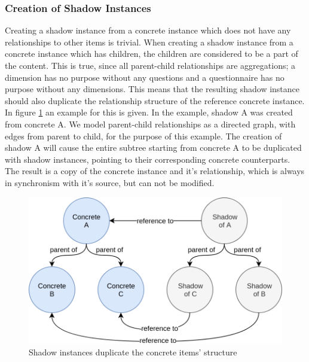 \documentclass[a4paper,11pt]{article}
\begin{document}
                \subsubsection{Creation of Shadow Instances}
                    Creating a shadow instance from a concrete instance which
                    does not have any relationships to other items is trivial.
                    When creating a shadow instance from a concrete instance
                    which has children, the children are considered to be a part
                    of the content. This is true, since all parent-child
                    relationships are aggregations; a dimension has no purpose
                    without any questions and a questionnaire has no purpose
                    without any dimensions. This means that the resulting shadow
                    instance should also duplicate the relationship structure
                    of the reference concrete instance. In figure \ref{fig:concrete-shadow}
                    an example for this is given. In the example, shadow A
                    was created from concrete A. We model parent-child relationships
                    as a directed graph, with edges from parent to child, for the 
                    purpose of this example. The creation of shadow A will cause the
                    entire subtree starting from concrete A to be duplicated
                    with shadow instances, pointing to their corresponding
                    concrete counterparts. The result is a copy of the
                    concrete instance and it's relationship, which is always
                    in synchronism with it's source, but can not be modified.

                    \begin{figure}
                        \centering
                        \includegraphics[width=.58\textwidth]{concrete-shadow}
                        \caption{Shadow instances duplicate the concrete items' structure}
                        \label{fig:concrete-shadow}
                    \end{figure}
\end{document}
